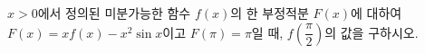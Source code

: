 \hspace*{2mm}\begin{minipage}[t]{\dimexpr\linewidth-2mm\relax}\vspace{0pt}
$x>0$에서 정의된 미분가능한 함수 $f(x)$의 한 부정적분 $F(x)$에 대하여 $F(x)=xf(x)-x^2\sin x$이고 $F(\pi)=\pi$일 때, $f\!\left(\dfrac{\pi}{2}\right)$의 값을 구하시오.\end{minipage}
